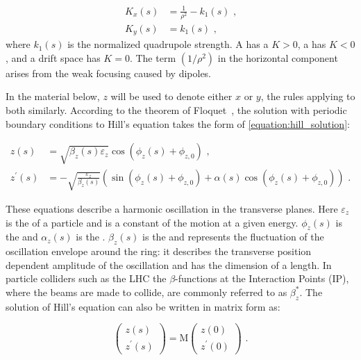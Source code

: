 \begin{equation}
	\begin{aligned}
		K_x(s) &= \frac{1}{\rho^2} - k_1(s) \text{ ,} \\
    	K_y(s) &= k_1(s) \text{ ,}
	\end{aligned}
    \label{equation:transverse_focusing_strengths}
\end{equation}
where \(k_1(s)\) is the normalized quadrupole strength.
A  has a \(K > 0\), a  has \(K < 0\), and a drift space has \(K = 0\).
The term \(\left(1 / \rho^2\right)\) in the horizontal component arises from the weak focusing caused by dipoles.

In the material below, \(z\) will be used to denote either \(x\) or \(y\), the rules applying to both similarly.
According to the theorem of Floquet~\cite{BOOK:Lee:Accelerator_physics}, the solution with periodic boundary conditions to Hill’s equation takes the form of \cref{equation:hill_solution}:

\begin{equation}
    \begin{aligned}
        z(s)          &= \sqrt{\beta_{z}(s) \varepsilon_{z}} \cos \left( \phi_{z}(s) + \phi_{z,0} \right) \text{ ,} \\
        z^{\prime}(s) &= -\sqrt{\frac{\varepsilon_z}{\beta_z(s)}} \left( \sin \left(\phi_z(s) + \phi_{z, 0} \right) + \alpha(s) \cos \left( \phi_z(s) + \phi_{z, 0} \right) \right) \text{ .}
    \end{aligned}
    \label{equation:hill_solution}
\end{equation}

These equations describe a harmonic oscillation in the transverse planes.
Here \(\varepsilon_z\) is the  of a particle and is a constant of the motion at a given energy. 
\(\phi_z(s)\) is the  and \(\alpha_z(s)\) is the .
\(\beta_z(s)\) is the  and represents the fluctuation of the oscillation envelope around the ring: it describes the transverse position dependent amplitude of the oscillation and has the dimension of a length.
In particle colliders such as the LHC the \(\beta\)-functions at the Interaction Points (IP), where the beams are made to collide, are commonly referred to as \(\beta_z^{\ast}\).
The solution of Hill's equation can also be written in matrix form as:

\begin{equation}
    \left(
        \begin{array}{c}
            z(s) \\
            z^{\prime}(s)
        \end{array} \right) = \mathrm{M} \left( 
        \begin{array}{c}
            z(0) \\
            z^{\prime}(0)
    \end{array} \right) \text{ .}
    \label{equation:hill_solution_matrix}
\end{equation}

